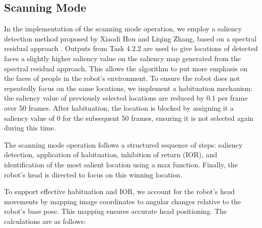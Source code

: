 \documentclass{CSSRforAfrica}
\begin{document}
\subsection{Scanning Mode}
In the implementation of the scanning mode operation, we employ a saliency detection method proposed by Xiaodi Hou and Liqing Zhang, based on a spectral residual approach \cite{hou2007saliency}. Outputs from Task 4.2.2 are used to give locations of detected faces a slightly higher saliency value on the saliency map generated from the spectral residual approach. This allows the algorithm to put more emphasis on the faces of people in the robot's environment. To ensure the robot does not repeatedly focus on the same locations, we implement a habituation mechanism: the saliency value of previously selected locations are reduced by 0.1 per frame over 50 frames. After habituation, the location is blocked by assigning it a saliency value of 0 for the subsequent 50 frames, ensuring it is not selected again during this time.

The scanning mode operation follows a structured sequence of steps: saliency detection, application of habituation, inhibition of return (IOR), and identification of the most salient location using a max function. Finally, the robot’s head is directed to focus on this winning location.




To support effective habituation and IOR, we account for the robot's head movements by mapping image coordinates to angular changes relative to the robot’s base pose. This mapping ensures accurate head positioning. The calculations are as follows:
\end{document}
